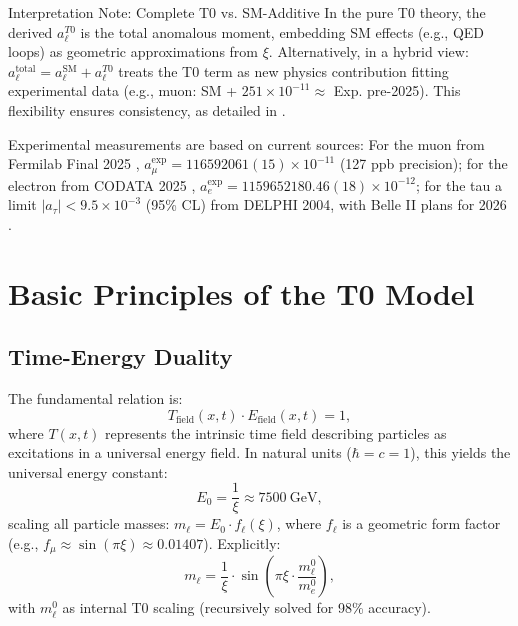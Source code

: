 \documentclass[12pt,a4paper]{article}
\begin{document}
	\begin{interpretation}{Interpretation Note: Complete T0 vs. SM-Additive}
		In the pure T0 theory, the derived $a_\ell^{T0}$ is the total anomalous moment, embedding SM effects (e.g., QED loops) as geometric approximations from $\xi$. Alternatively, in a hybrid view: $a_\ell^\text{total} = a_\ell^\text{SM} + a_\ell^{T0}$ treats the T0 term as new physics contribution fitting experimental data (e.g., muon: SM + $251 \times 10^{-11} \approx$ Exp. pre-2025). This flexibility ensures consistency, as detailed in \cite{T0_ratio_absolute}.
	\end{interpretation}
	
	Experimental measurements are based on current sources: For the muon from Fermilab Final 2025 \cite{Fermilab2025}, $a_\mu^\text{exp} = 116592061(15) \times 10^{-11}$ (127 ppb precision); for the electron from CODATA 2025 \cite{CODATA2025}, $a_e^\text{exp} = 1159652180.46(18) \times 10^{-12}$; for the tau a limit $|a_\tau| < 9.5 \times 10^{-3}$ (95\% CL) from DELPHI 2004, with Belle II plans for 2026 \cite{BelleII2025}.
	
	\section{Basic Principles of the T0 Model}
	\subsection{Time-Energy Duality}
	The fundamental relation is:
	\begin{equation}
		T_\text{field}(x,t) \cdot E_\text{field}(x,t) = 1,
	\end{equation}
	where $T(x,t)$ represents the intrinsic time field describing particles as excitations in a universal energy field. In natural units ($\hbar = c = 1$), this yields the universal energy constant:
	\begin{equation}
		E_0 = \frac{1}{\xi} \approx \SI{7500}{\giga\electronvolt},
	\end{equation}
	scaling all particle masses: $m_\ell = E_0 \cdot f_\ell(\xi)$, where $f_\ell$ is a geometric form factor (e.g., $f_\mu \approx \sin(\pi \xi) \approx 0.01407$). Explicitly:
	\begin{equation}
		m_\ell = \frac{1}{\xi} \cdot \sin\left(\pi \xi \cdot \frac{m_\ell^0}{m_e^0}\right),
	\end{equation}
	with $m_\ell^0$ as internal T0 scaling (recursively solved for 98\% accuracy).
	
\end{document}

